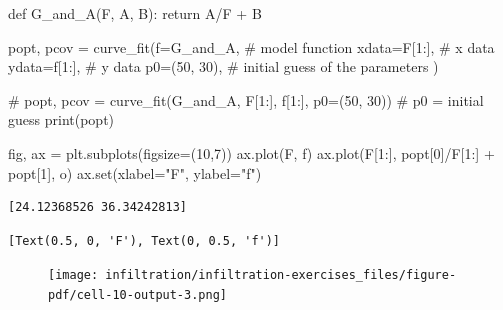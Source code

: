 \documentclass[
  letterpaper,
  DIV=11,
  numbers=noendperiod]{scrreprt}
\newenvironment{Shaded}{\begin{snugshade}}{\end{snugshade}}
\newcommand{\BuiltInTok}[1]{\textcolor[rgb]{0.00,0.23,0.31}{#1}}
\newcommand{\CommentTok}[1]{\textcolor[rgb]{0.37,0.37,0.37}{#1}}
\newcommand{\ControlFlowTok}[1]{\textcolor[rgb]{0.00,0.23,0.31}{#1}}
\newcommand{\DecValTok}[1]{\textcolor[rgb]{0.68,0.00,0.00}{#1}}
\newcommand{\KeywordTok}[1]{\textcolor[rgb]{0.00,0.23,0.31}{#1}}
\newcommand{\NormalTok}[1]{\textcolor[rgb]{0.00,0.23,0.31}{#1}}
\newcommand{\OperatorTok}[1]{\textcolor[rgb]{0.37,0.37,0.37}{#1}}
\newcommand{\StringTok}[1]{\textcolor[rgb]{0.13,0.47,0.30}{#1}}
\begin{document}
\begin{Shaded}
\begin{Highlighting}[]
\KeywordTok{def}\NormalTok{ G\_and\_A(F, A, B):}
    \ControlFlowTok{return}\NormalTok{ A}\OperatorTok{/}\NormalTok{F }\OperatorTok{+}\NormalTok{ B}

\NormalTok{popt, pcov }\OperatorTok{=}\NormalTok{ curve\_fit(f}\OperatorTok{=}\NormalTok{G\_and\_A,     }\CommentTok{\# model function}
\NormalTok{                       xdata}\OperatorTok{=}\NormalTok{F[}\DecValTok{1}\NormalTok{:],       }\CommentTok{\# x data}
\NormalTok{                       ydata}\OperatorTok{=}\NormalTok{f[}\DecValTok{1}\NormalTok{:],       }\CommentTok{\# y data}
\NormalTok{                       p0}\OperatorTok{=}\NormalTok{(}\DecValTok{50}\NormalTok{, }\DecValTok{30}\NormalTok{),   }\CommentTok{\# initial guess of the parameters}
\NormalTok{                      )}

\CommentTok{\# popt, pcov = curve\_fit(G\_and\_A, F[1:], f[1:], p0=(50, 30))  \# p0 = initial guess}
\BuiltInTok{print}\NormalTok{(popt)}

\NormalTok{fig, ax }\OperatorTok{=}\NormalTok{ plt.subplots(figsize}\OperatorTok{=}\NormalTok{(}\DecValTok{10}\NormalTok{,}\DecValTok{7}\NormalTok{))}
\NormalTok{ax.plot(F, f)}
\NormalTok{ax.plot(F[}\DecValTok{1}\NormalTok{:], popt[}\DecValTok{0}\NormalTok{]}\OperatorTok{/}\NormalTok{F[}\DecValTok{1}\NormalTok{:] }\OperatorTok{+}\NormalTok{ popt[}\DecValTok{1}\NormalTok{], }\StringTok{\textquotesingle{}o\textquotesingle{}}\NormalTok{)}
\NormalTok{ax.}\BuiltInTok{set}\NormalTok{(xlabel}\OperatorTok{=}\StringTok{"F"}\NormalTok{,}
\NormalTok{       ylabel}\OperatorTok{=}\StringTok{"f"}\NormalTok{)}
\end{Highlighting}
\end{Shaded}

\begin{verbatim}
[24.12368526 36.34242813]
\end{verbatim}

\begin{verbatim}
[Text(0.5, 0, 'F'), Text(0, 0.5, 'f')]
\end{verbatim}

\begin{figure}[H]

{\centering \texttt{[image: infiltration/infiltration-exercises\_files/figure-pdf/cell-10-output-3.png]}

}

\end{figure}
\end{document}
